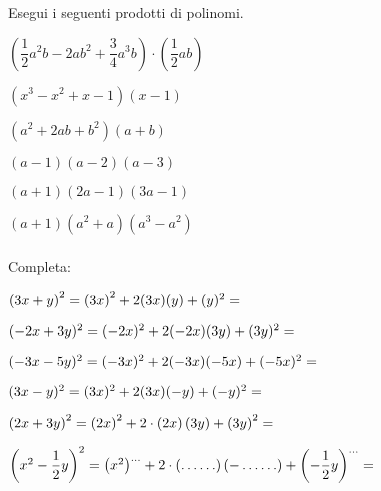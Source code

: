 \subsubsection*{}

\begin{esercizio}
\label{ese:10.20}
Esegui i seguenti prodotti di polinomi.
\begin{multicols}{2}
\begin{enumeratea}
 \item 
$\left(\dfrac{1}{2}a^{2}b-2{ab}^{2}+\dfrac{3}{4}a^{3}b\right)\cdot\left(\dfrac{1
}{2}{ab}\right)$
 \item $\left(x^{3}-x^{2}+x-1\right)({x}-1)$
 \item $\left(a^{2}+2{ab}+b^{2}\right)(a+b)$
 \item $(a-1)(a-2)(a-3)$
 \item $(a+1)(2a-1)(3a-1)$
 \item $(a+1)\left(a^{2}+a\right)\left(a^{3}-a^{2}\right)$
\end{enumeratea}
\end{multicols}
\end{esercizio}



\subsubsection*{}

\begin{esercizio}
 \label{ese:11.1}
Completa:

\begin{enumeratea}
\item $ \left( 3x + y\right)^{2} = \left(3x\right)^{2} + 2(3x)(y) + (y) ^{2} = 
\dotfill~$
\item $ (-2x + 3y)^{2} = (-2x)^{2} + 2(-2x)(3y) +(3y)^{2} = \dotfill~$
\item $(-3x -5y)^{2} = (-3x)^{2} + 2(-3x)(-5x)+(-5x)^{2}= \dotfill~$
\item $(3x - y)^{2} = (3x)^{2} +2(3x)(-y) + (-y)^{2} = \dotfill~$
\item 
$\left(2x+3y\right)^{2}=\left(2x\right)^{2}
+2\cdot\left(2x\right)\left(3y\right)+\left(3y\right)^{2}=\dotfill$
\item $\left(x^{2}-\dfrac{1}{2}y\right)^{2}=\left(x^{2}\right)^{\ldots}+2\cdot%
\left(\ldots \ldots \right)\left(-\ldots \ldots%
\right)+\left(-{\dfrac{1}{2}}y\right)^{\ldots }=\dotfill~$
\end{enumeratea}
\end{esercizio}


